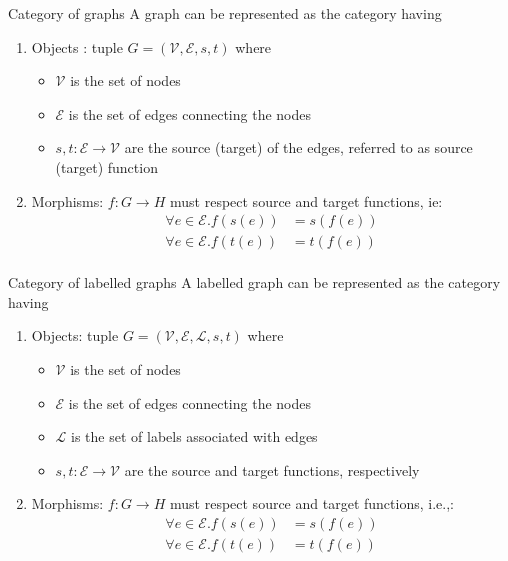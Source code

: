 \begin{example}{Category of graphs}
	A graph can be represented as the category having
	\begin{enumerate}
		\item Objects : tuple $G = (\mathcal{V},\mathcal{E},s,t)$ where
		\begin{itemize}
			\item $\mathcal{V}$ is the set of nodes
			\item $\mathcal{E}$ is the set of edges connecting the nodes
			\item $s, t : \mathcal{E}\rightarrow\mathcal{V}$ are the source (target) of the edges, referred to as source (target) function
		\end{itemize}
		\item Morphisms: $f : G \rightarrow H$ must respect source and target functions, ie:
		\begin{align*}
			\forall e \in \mathcal{E}.f(s(e)) &= s(f(e))\\
			\forall e \in \mathcal{E}.f(t(e)) &= t(f(e))\\
		\end{align*}
	\end{enumerate}
\end{example}
\begin{example}{Category of labelled graphs}
	A labelled graph can be represented as the category having
	\begin{enumerate}
		\item Objects: tuple $G = (\mathcal{V},\mathcal{E},\mathcal{L},s,t)$ where
		\begin{itemize}
			\item $\mathcal{V}$ is the set of nodes
			\item $\mathcal{E}$ is the set of edges connecting the nodes
			\item $\mathcal{L}$ is the set of labels associated with edges
			\item $s, t : \mathcal{E}\rightarrow\mathcal{V}$ are the source and target functions, respectively
		\end{itemize}
		\item Morphisms: $f : G \rightarrow H$ must respect source and target functions, i.e.,:
		\begin{align*}
			\forall e \in \mathcal{E}.f(s(e)) &= s(f(e))\\
			\forall e \in \mathcal{E}.f(t(e)) &= t(f(e))
		\end{align*}
	\end{enumerate}
\end{example}

